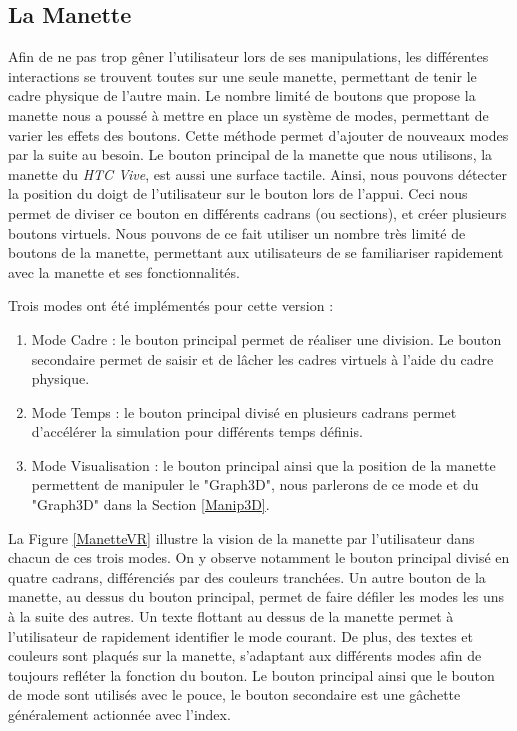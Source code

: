 		\subsection{La Manette}		
		Afin de ne pas trop gêner l'utilisateur lors de ses manipulations, les différentes interactions se trouvent toutes sur une seule manette, permettant de tenir le cadre physique de l'autre main. Le nombre limité de boutons que propose la manette nous a poussé à mettre en place un système de modes, permettant de varier les effets des boutons. Cette méthode permet d'ajouter de nouveaux modes par la suite au besoin. 		
		Le bouton principal de la manette que nous utilisons, la manette du \textit{HTC Vive}, est aussi une surface tactile. Ainsi, nous pouvons détecter la position du doigt de l'utilisateur sur le bouton lors de l'appui. Ceci nous permet de diviser ce bouton en différents cadrans (ou sections), et créer plusieurs boutons virtuels. Nous pouvons de ce fait utiliser un nombre très limité de boutons de la manette, permettant aux utilisateurs de se familiariser rapidement avec la manette et ses fonctionnalités. 
		
		Trois modes ont été implémentés pour cette version :		
		\begin{enumerate}
			\item Mode Cadre : le bouton principal permet de réaliser une division. Le bouton secondaire permet de saisir et de lâcher les cadres virtuels à l'aide du cadre physique.
			\item Mode Temps : le bouton principal divisé en plusieurs cadrans permet d'accélérer la simulation pour différents temps définis.
			\item Mode Visualisation : le bouton principal ainsi que la position de la manette permettent de manipuler le "Graph3D", nous parlerons de ce mode et du "Graph3D" dans la Section \ref{Manip3D}.
		\end{enumerate}
		
		La Figure \ref{ManetteVR} illustre la vision de la manette par l'utilisateur dans chacun de ces trois modes. On y observe notamment le bouton principal divisé en quatre cadrans, différenciés par des couleurs tranchées. Un autre bouton de la manette, au dessus du bouton principal, permet de faire défiler les modes les uns à la suite des autres. Un texte flottant au dessus de la manette permet à l'utilisateur de rapidement identifier le mode courant. De plus, des textes et couleurs sont plaqués sur la manette, s'adaptant aux différents modes afin de toujours refléter la fonction du bouton. Le bouton principal ainsi que le bouton de mode sont utilisés avec le pouce, le bouton secondaire est une gâchette généralement actionnée avec l'index.
		
